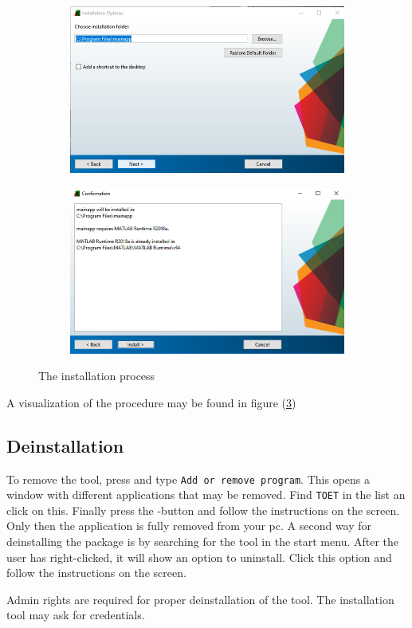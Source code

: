 \documentclass{article}
\begin{document}
\begin{figure}[b!]
\centering
\begin{subfigure}{.5\textwidth}
  \centering
  \includegraphics[width=.75\linewidth]{install1.png}
  \label{fig:sub1}
\end{subfigure}%
\begin{subfigure}{.5\textwidth}
  \centering
  \includegraphics[width=.75\linewidth]{install2.png}
  \label{fig:sub2}
\end{subfigure}
\caption{The installation process}
\label{fig:install}
\end{figure}

A visualization of the procedure may be found in figure (\ref{fig:install})
\bigskip
\subsection{Deinstallation}
To remove the tool, press  and type \texttt{Add or remove program}. This opens a window with different applications that may be removed. Find \texttt{TOET} in the list an click on this. Finally press the -button and follow the instructions on the screen. Only then the application is fully removed from your pc. A second way for deinstalling the package is by searching for the tool in the start menu. After the user has right-clicked, it will show an option to uninstall. Click this option and follow the instructions on the screen.
\begin{info}
Admin rights are required for proper deinstallation of the tool. The installation tool may ask for credentials.
\end{info}
\end{document}
